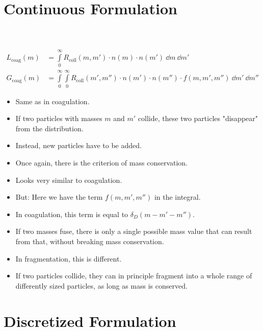 \section{Continuous Formulation}

    

     \\
     \\

    \begin{align}
        L_\text{coag}(m)
            &= \int\limits_0^\infty R_\text{coll}(m, m') \cdot n(m) \cdot n(m') \ \dd m \ \dd m' \\
        G_\text{coag}(m)
            &= \int\limits_0^\infty \int\limits_0^\infty R_\text{coll}(m', m'') \cdot
                n(m') \cdot n(m'') \cdot f(m,m',m'') \ \dd m' \ \dd m'' 
    \end{align}

    \begin{itemize}
        \item Same as in coagulation.
        \item If two particles with masses $m$ and $m'$ collide, these two particles "disappear"
              from the distribution.
        \item Instead, new particles have to be added.
        \item Once again, there is the criterion of mass conservation.
    \end{itemize}

    \begin{itemize}
        \item Looks very similar to coagulation.
        \item But: Here we have the term $f(m,m',m'')$ in the integral.
        \item In coagulation, this term is equal to $\delta_D(m-m'-m'')$.
        \item If two masses fuse, there is only a single possible mass value that can result from 
              that, without breaking mass conservation.
        \item In fragmentation, this is different.
        \item If two particles collide, they can in principle fragment into a whole range of 
              differently sized particles, as long as mass is conserved.
    \end{itemize}

\section{Discretized Formulation}
